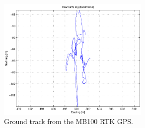 \begin{figure}[h]
	\centering
	\includegraphics[width=0.65\textwidth]{pdf/mb100}
	\caption{Ground track from the MB100 \ac{RTK} \ac{GPS}.}
	\label{fig:mb100}
\end{figure}

